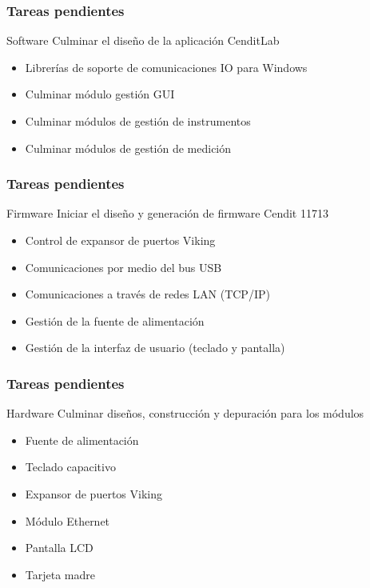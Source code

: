 \documentclass[xcolor=pdftext, table]{beamer}
\begin{document}
	\begin{frame}
		\frametitle{Tareas pendientes}	
			
			\begin{block}{Software}
				Culminar el diseño de la aplicación CenditLab
				\begin{itemize}
					\item Librerías de soporte de comunicaciones IO para Windows
					\item Culminar módulo gestión GUI
					\item Culminar módulos de gestión de instrumentos
					\item Culminar módulos de gestión de medición
				\end{itemize}
					
			\end{block}		

		\end{frame}
	
	\begin{frame}
	
	\frametitle{Tareas pendientes}		
	
		\begin{block}{Firmware}
			Iniciar el diseño y generación de firmware Cendit 11713
			\begin{itemize}
				\item Control de expansor de puertos Viking
				\item Comunicaciones por medio del bus USB
				\item Comunicaciones a través de redes LAN (TCP/IP)
				\item Gestión de la fuente de alimentación
				\item Gestión de la interfaz de usuario (teclado y pantalla)
			\end{itemize}
		\end{block}

	\end{frame}	

	\begin{frame}
		\frametitle{Tareas pendientes}			
	
		\begin{block}{Hardware}
			Culminar diseños, construcción y depuración para los módulos 
			\begin{itemize}
				\item Fuente de alimentación
				\item Teclado capacitivo
				\item Expansor de puertos Viking 
				\item Módulo Ethernet
				\item Pantalla LCD	
				\item Tarjeta madre				
			\end{itemize}
		\end{block}
	
	\end{frame}
\end{document}
